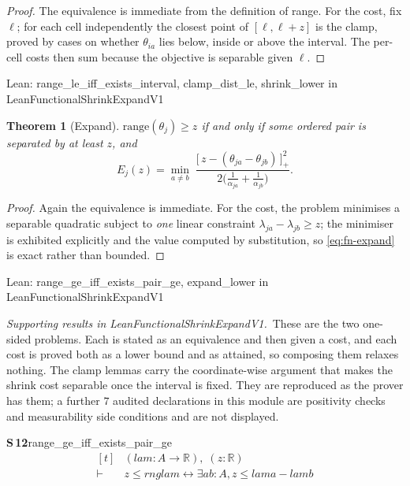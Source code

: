 \documentclass[conference]{IEEEtran}
\newtheorem{theorem}{Theorem}
\theoremstyle{definition}
\newcommand{\lean}[1]{\textsf{\footnotesize #1}}
\newcommand{\leanbox}[1]{%
  \par\vspace{2pt}\noindent
  {\footnotesize\textsf{Lean: #1}}\par\vspace{2pt}}
\begin{document}
\begin{proof}
The equivalence is immediate from the definition of range. For the cost, fix $\ell$; for each
cell independently the closest point of $[\ell,\ell+z]$ is the clamp, proved by cases on
whether $\theta_{ia}$ lies below, inside or above the interval. The per-cell costs then sum
because the objective is separable given $\ell$.
\end{proof}

\leanbox{\lean{range\_le\_iff\_exists\_interval}, \lean{clamp\_dist\_le},
\lean{shrink\_lower} in \lean{LeanFunctionalShrinkExpandV1}}

\begin{theorem}[Expand]
\label{thm:fn-expand}
$\mathrm{range}(\theta_{j})\ge z$ if and only if some \emph{ordered} pair is separated by at
least $z$, and
\begin{equation}
E_{j}(z)=\min_{a\neq b}\;
\frac{\bigl[\,z-(\theta_{ja}-\theta_{jb})\,\bigr]_{+}^{2}}
     {2\bigl(\frac{1}{\alpha_{ja}}+\frac{1}{\alpha_{jb}}\bigr)}.
\label{eq:fn-expand}
\end{equation}
\end{theorem}

\begin{proof}
Again the equivalence is immediate. For the cost, the problem minimises a separable quadratic
subject to \emph{one} linear constraint $\lambda_{ja}-\lambda_{jb}\ge z$; the minimiser is
exhibited explicitly and the value computed by substitution, so \eqref{eq:fn-expand} is exact
rather than bounded.
\end{proof}

\leanbox{\lean{range\_ge\_iff\_exists\_pair\_ge}, \lean{expand\_lower} in
\lean{LeanFunctionalShrinkExpandV1}}

\noindent\emph{Supporting results in \lean{LeanFunctionalShrinkExpandV1}.}~These are the two one-sided problems. Each is stated as an equivalence and then given a cost, and each cost is proved both as a lower bound and as attained, so composing them relaxes nothing. The clamp lemmas carry the coordinate-wise argument that makes the shrink cost separable once the interval is fixed. They are reproduced as the prover has them; a further $7$ audited declarations in this module are positivity checks and measurability side conditions and are not displayed.

\noindent\textbf{S\,12}\quad\lean{range\_ge\_iff\_exists\_pair\_ge}
{\footnotesize\[ \begin{aligned}[t]
&(\mathit{lam} : \mathit{A} \to \mathbb{R} ),\; (\mathit{z} : \mathbb{R} )\\
\vdash\;&\mathit{z} \leq \mathit{rng} \mathit{lam} \leftrightarrow \exists \mathit{a} \mathit{b} : \mathit{A}, \mathit{z} \leq \mathit{lam} \mathit{a} - \mathit{lam} \mathit{b}
\end{aligned} \]}
\end{document}
